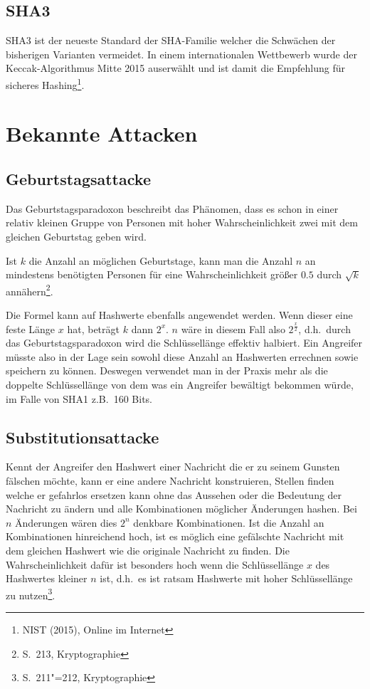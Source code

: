 \subsection{\ac{SHA3}}

SHA3 ist der neueste Standard der SHA-Familie welcher die Schwächen
der bisherigen Varianten vermeidet.  In einem internationalen
Wettbewerb wurde der Keccak-Algorithmus Mitte 2015 auserwählt und ist
damit die Empfehlung für sicheres Hashing\footnote{NIST (2015), Online
  im Internet}.

\section{Bekannte Attacken}

\subsection{Geburtstagsattacke}

Das Geburtstagsparadoxon beschreibt das Phänomen, dass es schon in
einer relativ kleinen Gruppe von Personen mit hoher Wahrscheinlichkeit
zwei mit dem gleichen Geburtstag geben wird.

Ist $k$ die Anzahl an möglichen Geburtstage, kann man die Anzahl $n$
an mindestens benötigten Personen für eine Wahrscheinlichkeit größer
$0.5$ durch $\sqrt{k}$ annähern\footnote{S.~213, Kryptographie}.

Die Formel kann auf Hashwerte ebenfalls angewendet werden.  Wenn
dieser eine feste Länge $x$ hat, beträgt $k$ dann $2^x$.  $n$ wäre in
diesem Fall also $2^{\frac{x}{2}}$, d.h.~durch das
Geburtstagsparadoxon wird die Schlüssellänge effektiv halbiert.  Ein
Angreifer müsste also in der Lage sein sowohl diese Anzahl an
Hashwerten errechnen sowie speichern zu können.  Deswegen verwendet
man in der Praxis mehr als die doppelte Schlüssellänge von dem was ein
Angreifer bewältigt bekommen würde, im Falle von SHA1 z.B.~160 Bits.

\subsection{Substitutionsattacke}

Kennt der Angreifer den Hashwert einer Nachricht die er zu seinem
Gunsten fälschen möchte, kann er eine andere Nachricht konstruieren,
Stellen finden welche er gefahrlos ersetzen kann ohne das Aussehen
oder die Bedeutung der Nachricht zu ändern und alle Kombinationen
möglicher Änderungen hashen.  Bei $n$ Änderungen wären dies $2^n$
denkbare Kombinationen.  Ist die Anzahl an Kombinationen hinreichend
hoch, ist es möglich eine gefälschte Nachricht mit dem gleichen
Hashwert wie die originale Nachricht zu finden.  Die
Wahrscheinlichkeit dafür ist besonders hoch wenn die Schlüssellänge
$x$ des Hashwertes kleiner $n$ ist, d.h.~es ist ratsam Hashwerte mit
hoher Schlüssellänge zu nutzen\footnote{S.~211"=212, Kryptographie}.

